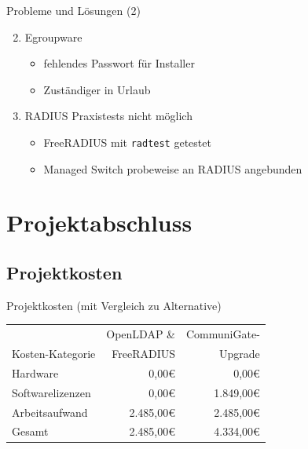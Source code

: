 \documentclass[presentation,svgnames,12pt]{beamer}
\begin{document}
\begin{frame}{Probleme und Lösungen (2)}
\begin{enumerate}
	\setcounter{enumi}{1}
	\item Egroupware
	\vspace{6pt}
	\begin{itemize}
		\item fehlendes Passwort für Installer
		\item Zuständiger in Urlaub
	\end{itemize}
	\medskip
	\item RADIUS Praxistests nicht möglich
	\vspace{6pt}
	\begin{itemize}
		\item FreeRADIUS mit \texttt{radtest} getestet%
		\item Managed Switch probeweise an RADIUS angebunden
	\end{itemize}
\end{enumerate}
\end{frame}

\section{Projektabschluss}
\subsection{Projektkosten}
\begin{frame}{Projektkosten (mit Vergleich zu Alternative)}
\begin{table}
\centering
	\begin{tabularx}{0.9\textwidth}{|X|r|r|}
		\hline
		 	&	OpenLDAP \& &	CommuniGate-\\
		Kosten-Kategorie	&	FreeRADIUS &	Upgrade\\
		\hline
		Hardware &	0,00\euro{} &	0,00\euro{}\\
		\hline
		Softwarelizenzen &	0,00\euro{} &	1.849,00\euro{}\\
		\hline
		Arbeitsaufwand &	2.485,00\euro{} &	2.485,00\euro{}\\
		\hhline{|=|=|=|}
		Gesamt &	2.485,00\euro{} &	4.334,00\euro{}\\
		\hline
	\end{tabularx}
\end{table}
\end{frame}
\end{document}
